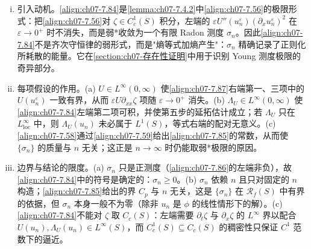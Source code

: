 ﻿\documentclass[../../main.tex]{subfiles}%
\begin{document}
\begin{remark}\label{remark:ch07-7.4.8测度}
\begin{enumerate}[(i)]
\item 引入动机。\eqref{align:ch07-7.84}是\cref{lemma:ch07-7.4.2}中\eqref{align:ch07-7.56}的极限形式：把\eqref{align:ch07-7.56}对 $\zeta\in C^1_c(S)$ 积分，左端的 $\varepsilon U''(u_n^\varepsilon)(\partial_xu_n^\varepsilon)^2$ 在 $\varepsilon\to0^+$ 时不消失，而是弱*收敛为一个有限 Radon 测度 $\sigma_n$。因此\eqref{align:ch07-7.84}不是齐次守恒律的弱形式，而是"熵等式加熵产生"：$\sigma_n$ 精确记录了正则化所耗散的能量。它在\cref{section:ch07-存在性证明}中用于识别 Young 测度极限的奇异部分。
\item 每项假设的作用。(a) $U\in L^\infty(0,\infty)$ 使\eqref{align:ch07-7.87}右端第一、三项中的 $U(u_n^\varepsilon)$ 一致有界，从而 $\varepsilon U\partial_{xx}\zeta$ 项随 $\varepsilon\to0^+$ 消失。(b) $\Lambda_U\in L^\infty(0,\infty)$ 使\eqref{align:ch07-7.84}左端第二项可积，并使第五步的延拓估计成立；若 $\Lambda_U$ 只在 $L^\infty_{\mathrm{loc}}$ 中，则 $\Lambda_U(u_n)$ 未必属于 $L^1(S)$，等式右端的配对无意义。(c) \eqref{align:ch07-7.58}通过\eqref{align:ch07-7.59}给出\eqref{align:ch07-7.85}的常数，从而使 $\{\sigma_n\}$ 的质量与 $n$ 无关；这正是 $n\to\infty$ 时仍能取弱*极限的原因。
\item 边界与结论的限度。(a) $\sigma_n$ 只是正测度（\eqref{align:ch07-7.86}的左端非负），故\eqref{align:ch07-7.84}中的符号是确定的：$\sigma_n\geqslant0$。(b) $\sigma_n$ 依赖 $n$ 且只对固定的 $n$ 构造；\eqref{align:ch07-7.85}给出的界 $C_p$ 与 $n$ 无关，这是 $\{\sigma_n\}$ 在 $\mathscr{R}_f(S)$ 中有界的依据，但 $\sigma_n$ 本身一般不为零（除非 $u_n$ 是 $\phi$ 的线性情形下的解）。(c) \eqref{align:ch07-7.84}不能对 $\zeta$ 取 $C_c(S)$：左端需要 $\partial_t\zeta$ 与 $\partial_x\zeta$ 的 $L^\infty$ 界以配合 $U(u_n),\Lambda_U(u_n)\in L^\infty(S)$，而 $C^1_c(S)\subseteq C_c(S)$ 的稠密性只保证 $C^1$ 范数下的逼近。
\end{enumerate}
\end{remark}
\end{document}
